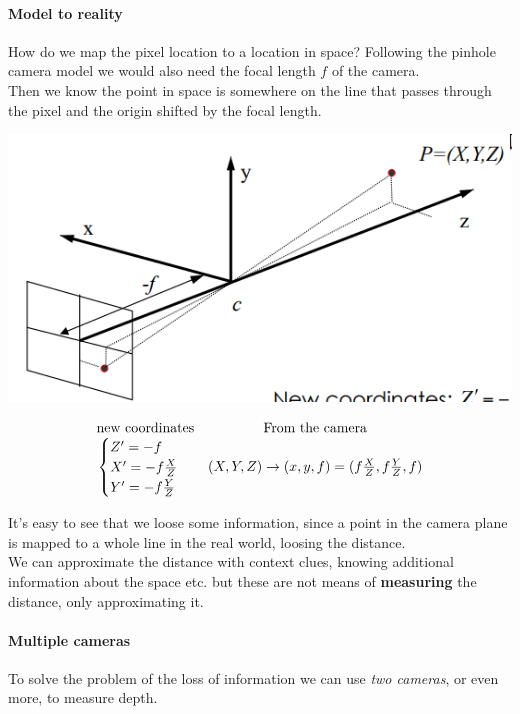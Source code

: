 \documentclass{article}
\begin{document}
\paragraph{Model to reality} How do we map the pixel location to a location in space? Following the pinhole camera model we would also need the focal length $f$ of the camera.\\
Then we know the point in space is somewhere on the line that passes through the pixel and the origin shifted by the focal length.
\begin{center}
    \includegraphics[width=0.8\linewidth]{images/focal.png}
\end{center}
\begin{align*}
    \begin{array}{cc}
        \text{new coordinates} & \text{From the camera}\\
        \begin{cases}
            Z' = -f \\
            X' = -f\frac{X}{Z} \\
            Y' = -f\frac YZ
        \end{cases} 
                             &
        (X,Y,Z) \to (x,y,f) = (f\frac XZ, f\frac YZ, f)
    \end{array}
\end{align*}

It's easy to see that we loose some information, since a point in the camera plane is mapped to a whole line in the real world, loosing the distance.\\
We can approximate the distance with context clues, knowing additional information about the space etc. but these are not means of \textbf{measuring} the distance, only approximating it.

\paragraph{Multiple cameras} To solve the problem of the loss of information we can use \textit{two cameras}, or even more, to measure depth.
\end{document}
